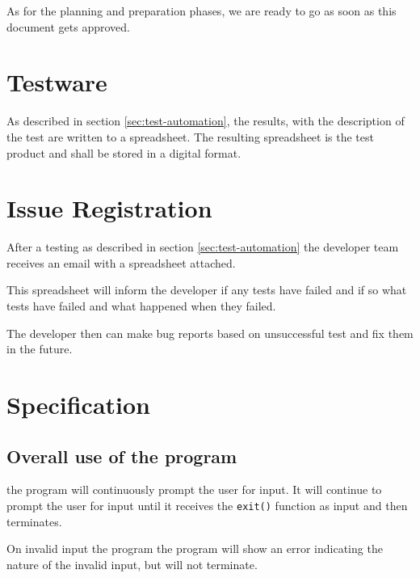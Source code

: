 \documentclass[11pt,a4paper]{article}
\begin{document}
As for the planning and preparation phases, we are ready to go as soon as this document gets approved.


\section{Testware}

As described in section \ref{sec:test-automation}, the results, with
the description of the test are written to a spreadsheet. The
resulting spreadsheet is the test product and shall be stored in a
digital format.


\section{Issue Registration}

After a testing as described in section \ref{sec:test-automation} the
developer team receives an email with a spreadsheet attached.

This spreadsheet will inform the developer if any tests have failed
and if so what tests have failed and what happened when they failed.

The developer then can make bug reports based on unsuccessful test and
fix them in the future.


\appendix
\section{Specification} \label{app:specification}
\subsection{Overall use of the program}
the program will continuously prompt the user for input. It will
continue to prompt the user for input until it receives the
\texttt{exit()} function as input and then terminates.

On invalid input the program the program will show an error
indicating the nature of the invalid input, but will not terminate.
\end{document}
